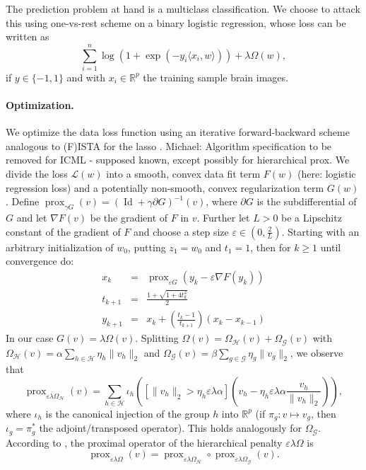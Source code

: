 \documentclass{article}
\DeclareMathOperator{\prox}{prox}
\DeclareMathOperator{\Id}{Id}
\newcommand{\R}{\mathbb{R}}
\begin{document}
The prediction problem at hand is a multiclass classification. We choose to
attack this using one-vs-rest scheme on a binary logistic regression, whose
loss can be written as
\[\sum_{i=1}^n\log(1 + \exp(-y_i\langle x_i, w\rangle)) + \lambda\Omega(w),\]
if \(y\in\{-1, 1\}\) and with \(x_i\in\R^p\) the training sample brain images.

\paragraph{Optimization.}
We optimize the data loss function using an iterative forward-backward
scheme analogous to (F)ISTA for the lasso \cite{beck2009}. 
{\color{red} Michael: Algorithm specification to be removed for ICML - supposed known, except possibly for hierarchical prox.}
We divide the
loss \(\mathcal L(w)\) into a smooth, convex data fit term \(F(w)\) (here: 
logistic regression loss) and a potentially non-smooth, convex 
regularization term \(G(w)\). 
Define \(\prox_{\gamma G}(v) = (\Id + \gamma\partial G)^{-1}(v)\), where \(\partial G\) is the subdifferential of \(G\) and 
let \(\nabla F(v)\) be the gradient of \(F\) in \(v\). Further let \(L > 0\)
be a Lipschitz constant of the gradient of \(F\) and choose a step size
\(\varepsilon\in (0, \frac{2}{L})\). Starting with an arbitrary 
initialization of \(w_0\), putting \(z_1 = w_0\) and \(t_1 = 1\), then for
\(k\geq 1\) until convergence do:
\begin{eqnarray*}
  x_k & = & \prox_{\varepsilon G}(y_k - \varepsilon\nabla F(y_k))\\
  t_{k + 1} & = & \frac{1 + \sqrt{1 + 4 t_k^2}}{2}\\
  y_{k + 1} & = & x_k + \left(\frac{t_k - 1}{t_{k + 1}}\right)(x_k - x_{k - 1})
\end{eqnarray*}
In our case \(G(v) = \lambda\Omega(v)\). Splitting \(\Omega(v) = \Omega_{\mathcal H}(v) + \Omega_{\mathcal G}(v)\) with 
\(\Omega_{\mathcal H}(v) = \alpha\sum_{h\in\mathcal H}\eta_h\|v_h\|_2\) and
\(\Omega_{\mathcal G}(v) = \beta\sum_{g\in\mathcal G}\eta_g\|v_g\|_2\), we observe
that \[\prox_{\varepsilon\lambda\Omega_{\mathcal H}}(v) = \sum_{h\in\mathcal H}\iota_h\left([\|v_h\|_2 > \eta_h\varepsilon\lambda\alpha]\left(v_h - \eta_h\varepsilon\lambda\alpha\frac{v_h}{\|v_h\|_2}\right)\right),\]
where \(\iota_h\) is the canonical injection of the group \(h\) into 
\(\R^p\) (if \(\pi_g: v\mapsto v_g\), then \(\iota_g = \pi_g^\ast\) the 
adjoint/transposed operator). This holds analogously for 
\(\Omega_{\mathcal G}\).
According to \cite{jenatton2011}, the proximal operator of 
the hierarchical penalty \(\varepsilon\lambda\Omega\) is
\[\prox_{\varepsilon\lambda\Omega}(v) = \prox_{\varepsilon\lambda\Omega_{\mathcal H}}\circ\prox_{\varepsilon\lambda\Omega_{\mathcal G}}(v).\]
\end{document}

